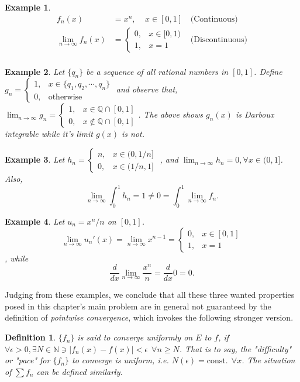 \documentclass[12pt]{article}
\newtheorem{defn}{Definition}[section]
\newtheorem{ex}{Example}[section]
\newcommand{\limn}{\lim_{n \rightarrow \infty}}
\newcommand{\N}{\mathbb{N}}
\begin{document}
\begin{ex}
	\begin{align*}
	f_n(x) &= x^n, ~~~~~ x \in [0, 1] &\text{(Continuous)} \\
	\limn f_n(x) &=
		\begin{cases}
		0, & x \in [0, 1)\\
		1, & x = 1
		\end{cases}
		&\text{(Discontinuous)}\\
	\end{align*}
\end{ex}
\begin{ex}
	Let $\{q_n\}$ be a sequence of all rational numbers in $[0, 1]$. Define \\
	$g_n = 
	\begin{cases}
		1, & x \in \{q_1, q_2, \cdots, q_n\} \\
		0, & \text{otherwise}
	\end{cases}$ and observe that, $\displaystyle{\limn g_n = 
	\begin{cases}
		1, & x \in \mathbb{Q} \cap [0, 1] \\
		0, & x \notin \mathbb{Q} \cap [0, 1]
	\end{cases}}$.
	The above shows $g_n(x)$ is Darboux integrable while it's limit $g(x)$ is not.
\end{ex}
\begin{ex}
	Let $h_n =
	\begin{cases}
		n, & x \in (0, 1/n] \\
		0, & x \in (1/n, 1]
	\end{cases}$
	, and $\limn h_n = 0, \forall x \in (0, 1]$. Also,
	\[ \limn \int_{0}^{1} h_n = 1 \neq 0 = \int_{0}^{1} \limn f_n. \]
\end{ex}
\begin{ex} Let $u_n = x^n/n$ on $[0, 1]$. \[ \limn u_n'(x) = \limn x^{n-1} = 
	\begin{cases}
		0, & x \in [0, 1]\\
		1, & x = 1
	\end{cases}\], while \[ \frac{d}{dx} \limn \frac{x^n}{n} = \frac{d}{dx} 0 = 0. \]
\end{ex}

Judging from these examples, we conclude that all these three wanted properties posed in this chapter's main problem are in general not guaranteed by the definition of \emph{pointwise convergence}, which invokes the following stronger version.

\begin{defn}
	$\{f_n\}$ is said to converge uniformly on $E$ to $f$, if $\forall \epsilon > 0, \exists N \in \N \ni  |f_n(x) - f(x)| < \epsilon ~~\forall n \geq N$. That is to say, the "difficulty" or "pace" for $\{f_n\}$ to converge is uniform, i.e. $N(\epsilon) = \text{const.} ~~\forall x$. The situation of $\sum f_n$ can be defined similarly. 
\end{defn}
\end{document}
